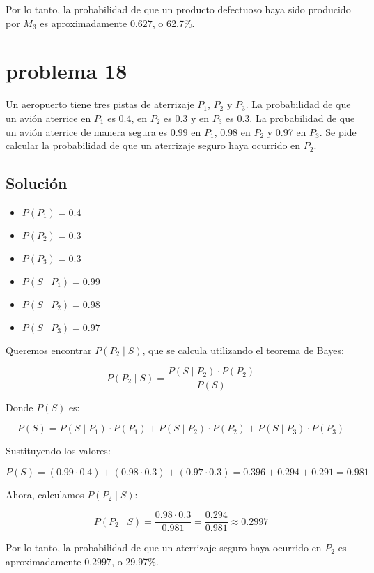\documentclass[12pt,a4paper]{article}
\begin{document}
Por lo tanto, la probabilidad de que un producto defectuoso haya sido producido por \( M_3 \) es aproximadamente \( 0.627 \), o 62.7\%.

\newpage 
\section*{problema 18}
Un aeropuerto tiene tres pistas de aterrizaje \( P_1 \), \( P_2 \) y \( P_3 \). La probabilidad de que un avión aterrice en \( P_1 \) es 0.4, en \( P_2 \) es 0.3 y en \( P_3 \) es 0.3. La probabilidad de que un avión aterrice de manera segura es 0.99 en \( P_1 \), 0.98 en \( P_2 \) y 0.97 en \( P_3 \). Se pide calcular la probabilidad de que un aterrizaje seguro haya ocurrido en \( P_2 \).

\subsection*{Solución}

\begin{itemize}
    \item \( P(P_1) = 0.4 \)
    \item \( P(P_2) = 0.3 \)
    \item \( P(P_3) = 0.3 \)
    \item \( P(S \mid P_1) = 0.99 \)
    \item \( P(S \mid P_2) = 0.98 \)
    \item \( P(S \mid P_3) = 0.97 \)
\end{itemize}

Queremos encontrar \( P(P_2 \mid S) \), que se calcula utilizando el teorema de Bayes:

\[
P(P_2 \mid S) = \frac{P(S \mid P_2) \cdot P(P_2)}{P(S)}
\]

Donde \( P(S) \) es:

\[
P(S) = P(S \mid P_1) \cdot P(P_1) + P(S \mid P_2) \cdot P(P_2) + P(S \mid P_3) \cdot P(P_3)
\]

Sustituyendo los valores:

\[
P(S) = (0.99 \cdot 0.4) + (0.98 \cdot 0.3) + (0.97 \cdot 0.3) = 0.396 + 0.294 + 0.291 = 0.981
\]

Ahora, calculamos \( P(P_2 \mid S) \):

\[
P(P_2 \mid S) = \frac{0.98 \cdot 0.3}{0.981} = \frac{0.294}{0.981} \approx 0.2997
\]

Por lo tanto, la probabilidad de que un aterrizaje seguro haya ocurrido en \( P_2 \) es aproximadamente \( 0.2997 \), o 29.97\%.
\end{document}

